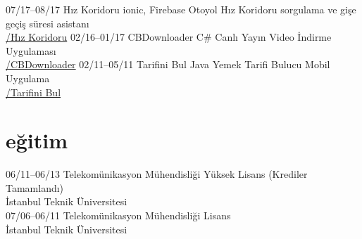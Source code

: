 \documentclass[]{../friggeri-cv} %
\begin{document}
\begin{entrylist}
\entry
{07/17--08/17}
{Hız Koridoru}
{ionic, Firebase}
{Otoyol Hız Koridoru sorgulama ve gişe geçiş süresi asistanı
\\\href{https://play.google.com/store/apps/details?id=com.harunsokullu.speedcorridor}{\faAndroid/Hız Koridoru}}
\entry
{02/16--01/17}
{CBDownloader}
{C\#}
{Canlı Yayın Video İndirme Uygulaması
\\\href{https://github.com/suphero/CBDownloader}{\faGithub/CBDownloader}}
\entry
{02/11--05/11}
{Tarifini Bul}
{Java}
{Yemek Tarifi Bulucu Mobil Uygulama
\\\href{https://play.google.com/store/apps/details?id=com.tarifinibul}{\faAndroid/Tarifini Bul}}

\end{entrylist}

\section{eğitim}

\begin{entrylist}

\entry
{06/11--06/13}
{Telekomünikasyon Mühendisliği}{}
{Yüksek Lisans (Krediler Tamamlandı)
\\İstanbul Teknik Üniversitesi}
\\
\entry
{07/06--06/11}
{Telekomünikasyon Mühendisliği}{}
{Lisans
\\İstanbul Teknik Üniversitesi}
	
\end{entrylist}
\end{document}
